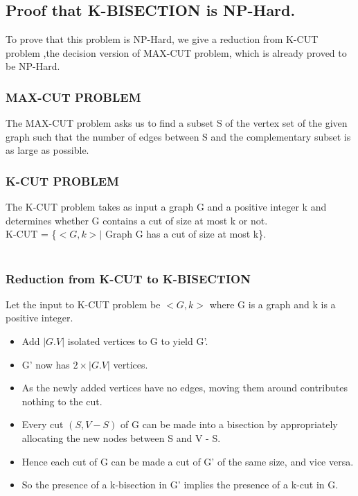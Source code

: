 \documentclass[10pt]{article}
\begin{document}
\subsection{Proof that K-BISECTION is NP-Hard.}

To prove that this problem is NP-Hard, we give a reduction from K-CUT problem ,the decision version of MAX-CUT problem, which is already proved to be NP-Hard.

\subsubsection{MAX-CUT PROBLEM}
The MAX-CUT problem asks us to find a subset S of the vertex set of the given graph such that the number of edges between S and the complementary subset is as large as possible.

\subsubsection{K-CUT PROBLEM}
The K-CUT problem takes as input a graph G and a positive integer k and determines whether G contains a cut of size at most k or not.\\
K-CUT = \{$<G,k> |$ Graph G has a cut of size at most k\}.\\
\\

\subsubsection{Reduction from K-CUT to K-BISECTION}
Let the input to K-CUT problem be $<G,k>$ where G is a graph and k is a positive integer.

\begin{itemize}
\item Add $|G.V|$ isolated vertices to G to yield G’.
\item G’  now has $2 × |G.V |$ vertices.
\item As the newly added vertices have no edges, moving them around contributes nothing to the cut.
\item Every cut $(S, V-S)$ of G can be made into a bisection by appropriately allocating the new nodes between S and V - S.
\item Hence each cut of G can be made a cut of G’ of the same size, and vice versa.	
\item So the presence of a k-bisection in G’ implies the presence of a k-cut in G.
\end{itemize}
\end{document}
